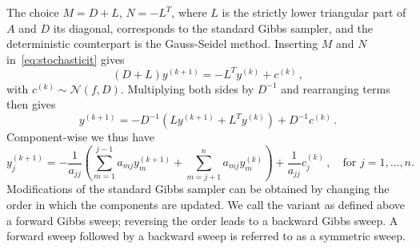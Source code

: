 \documentclass[
fontsize=11pt,
paper=a4,
numbers=noenddot
]{scrartcl}
\begin{document}
The choice $M = D + L$, $N = -L^T$, where $L$ is the strictly lower triangular part of $A$ and $D$ its diagonal, corresponds to the standard Gibbs sampler, and the deterministic counterpart is the Gauss-Seidel method.
Inserting $M$ and $N$ in~\eqref{eq:stochasticit} gives
\begin{equation*}
    \left(D + L\right) y^{(k+1)} = - L^T y^{(k)} + c^{(k)}\,,
\end{equation*}
with $c^{(k)} \sim \mathcal{N}(f,D)$. Multiplying both sides by $D^{-1}$ and rearranging terms then gives
\begin{equation*}
    y^{(k+1)} = - D^{-1} (L y^{(k+1)} + L^T y^{(k)}) + D^{-1} c^{(k)}\,.
\end{equation*}
Component-wise we thus have
\begin{equation}
    \label{eq:gibbs_comp}
    y^{(k+1)}_j = - \frac{1}{a_{jj}} \left(
      \sum_{m=1}^{j-1} a_{mj} y^{(k+1)}_m + \sum_{m=j+1}^n a_{mj} y^{(k)}_m
    \right) + \frac{1}{a_{jj}} c^{(k)}_j \,,\quad \text{for $j=1,\dotsc,n$.}
\end{equation}
Modifications of the standard Gibbs sampler can be obtained by changing the order in which the components are updated. We call the variant as defined above a forward Gibbs sweep; reversing the order leads to a backward Gibbs sweep. A forward sweep followed by a backward sweep is referred to as a symmetric sweep.  
\end{document}
